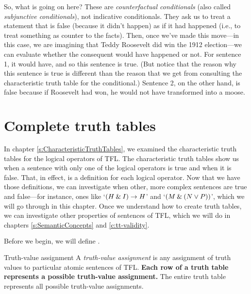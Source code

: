 So, what is going on here? These are \textit{counterfactual conditionals} (also called \textit{subjunctive conditionals}), not indicative conditionals. They ask us to treat a statement that is false (because it didn’t happen) as if it had happened (i.e., to treat something as counter to the facts). Then, once we’ve made this move---in this case, we are imagining that Teddy Roosevelt did win the 1912 election---we can evaluate whether the consequent would have happened or not. For sentence 1, it would have, and so this sentence is true. (But notice that the reason why this sentence is true is different than the reason that we get from consulting the characteristic truth table for the conditional.) Sentence 2, on the other hand, is false because if Roosevelt had won, he would not have transformed into a moose.





\chapter{Complete truth tables}
\label{s:CompleteTruthTables}

In chapter \ref{s:CharacteristicTruthTables}, we examined the characteristic truth tables for the logical operators of TFL. The characteristic truth tables show us when a sentence with only one of the logical operators is true and when it is false. That, in effect, is a definition for each logical operator. Now that we have those definitions, we can investigate when other, more complex sentences are true and false---for instance, ones like `$(H\mathbin{\&} I)\rightarrow H$' and `$(M \mathbin{\&} (N \vee P))$', which we will go through in this chapter. Once we understand how to create truth tables, we can investigate other properties of sentences of TFL, which we will do in chapters \ref{s:SemanticConcepts} and \ref{c:tt-validity}. 

Before we begin, we will define .

\begin{factboxy}{Truth-value assignment}
A \textit{truth-value assignment} is any assignment of truth values to particular atomic sentences of TFL. \textbf{Each row of a truth table represents a possible truth-value assignment.} The entire truth table represents all possible truth-value assignments.
\end{factboxy}

